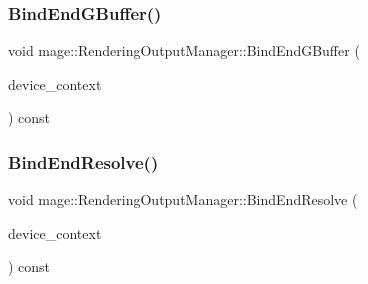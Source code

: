 \hypertarget{classmage_1_1_rendering_output_manager_ae304cfa194a46a82fb0e2deef68d7915}{}\label{classmage_1_1_rendering_output_manager_ae304cfa194a46a82fb0e2deef68d7915} 
\subsubsection{\texorpdfstring{Bind\+End\+G\+Buffer()}{BindEndGBuffer()}}
{\footnotesize\ttfamily void mage\+::\+Rendering\+Output\+Manager\+::\+Bind\+End\+G\+Buffer (\begin{DoxyParamCaption}\item[{I\+D3\+D11\+Device\+Context2 $\ast$}]{device\+\_\+context }\end{DoxyParamCaption}) const\hspace{0.3cm}{\ttfamily [noexcept]}}

\hypertarget{classmage_1_1_rendering_output_manager_afbcb1ae5b8d912a509902ab8d2b7fdbe}{}\label{classmage_1_1_rendering_output_manager_afbcb1ae5b8d912a509902ab8d2b7fdbe} 
\subsubsection{\texorpdfstring{Bind\+End\+Resolve()}{BindEndResolve()}}
{\footnotesize\ttfamily void mage\+::\+Rendering\+Output\+Manager\+::\+Bind\+End\+Resolve (\begin{DoxyParamCaption}\item[{I\+D3\+D11\+Device\+Context2 $\ast$}]{device\+\_\+context }\end{DoxyParamCaption}) const\hspace{0.3cm}{\ttfamily [noexcept]}}

\hypertarget{classmage_1_1_rendering_output_manager_ac27d156cacfe09e31e4c6867d45ee3f8}{}\label{classmage_1_1_rendering_output_manager_ac27d156cacfe09e31e4c6867d45ee3f8} 
